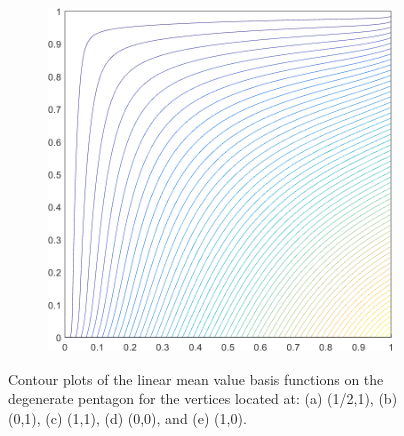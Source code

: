 \begin{figure}
\begin{subfigure}[b]{0.39\textwidth}
		\caption{}
	\end{subfigure}
	\hspace{1.5cm}
	\begin{subfigure}[b]{0.39\textwidth}
		\centering
		\includegraphics[width=\textwidth]{figures/sec_BF/deg_square_MV1_contour_b2.png}
		\caption{}
	\end{subfigure}
\caption{Contour plots of the linear mean value basis functions on the degenerate pentagon for the vertices located at: (a) (1/2,1), (b) (0,1), (c) (1,1), (d) (0,0), and (e) (1,0).}
\label{fig::2D_MV1_deg_square_basis_functions}
\end{figure}

